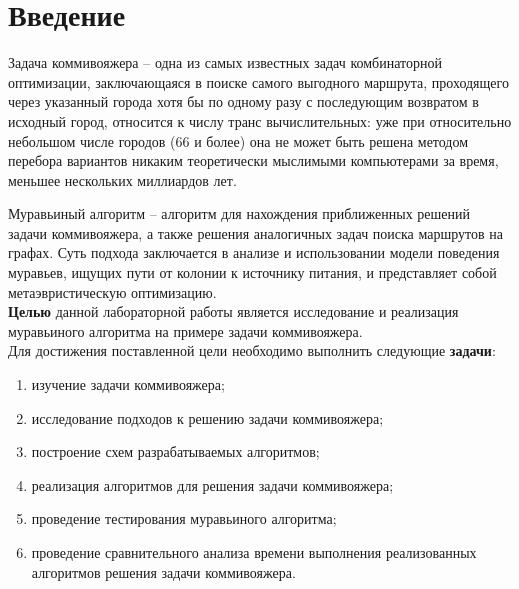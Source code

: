 \chapter*{Введение}

Задача коммивояжера -- одна из самых известных задач
комбинаторной оптимизации, заключающаяся в поиске самого выгодного маршрута, проходящего через указанный города хотя бы по одному разу с последующим возвратом в исходный город, относится к числу транс вычислительных: уже при относительно небольшом числе городов (66 и более) она не может быть решена методом перебора вариантов никаким теоретически мыслимыми компьютерами за время, меньшее нескольких миллиардов лет.

Муравьиный алгоритм -- алгоритм для нахождения приближенных решений задачи коммивояжера, а также решения аналогичных задач поиска маршрутов на графах. Суть подхода заключается в анализе и использовании модели поведения муравьев, ищущих пути от колонии к источнику питания, и представляет собой метаэвристическую оптимизацию.\\

\textbf{Целью} данной лабораторной работы является исследование и реализация муравьиного алгоритма на примере задачи коммивояжера.\\

Для достижения поставленной цели необходимо выполнить следующие \textbf{задачи}:

\begin{enumerate}
	\item изучение задачи коммивояжера;
	\item исследование подходов к решению задачи коммивояжера;
	\item построение схем разрабатываемых алгоритмов; 
	\item реализация алгоритмов для решения задачи коммивояжера;
	\item проведение тестирования муравьиного алгоритма;
	\item проведение сравнительного анализа времени выполнения реализованных алгоритмов решения задачи коммивояжера. 
\end{enumerate}

\newpage